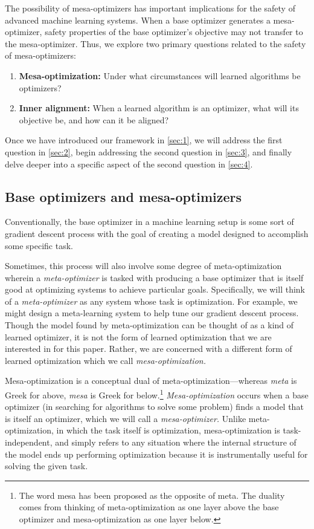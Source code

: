 \documentclass[
  onecolumn,
  natbib,
]{miri-tech-article}
\begin{document}
The possibility of mesa-optimizers has important implications for the safety of advanced machine learning systems. When a base optimizer generates a mesa-optimizer, safety properties of the base optimizer's objective may not transfer to the mesa-optimizer. Thus, we explore two primary questions related to the safety of mesa-optimizers:
\begin{enumerate}
\item \textbf{Mesa-optimization:} Under what circumstances will learned algorithms be optimizers?
\item \textbf{Inner alignment:} When a learned algorithm is an optimizer, what will its objective be, and how can it be aligned?
\end{enumerate}
Once we have introduced our framework in \cref{sec:1}, we will address the first question in \cref{sec:2}, begin addressing the second question in \cref{sec:3}, and finally delve deeper into a specific aspect of the second question in \cref{sec:4}.

\subsection{Base optimizers and mesa-optimizers}
\label{sec:1.1}

Conventionally, the base optimizer in a machine learning setup is some sort of gradient descent process with the goal of creating a model designed to accomplish some specific task.

Sometimes, this process will also involve some degree of meta-optimization wherein a \textit{meta-optimizer} is tasked with producing a base optimizer that is itself good at optimizing systems to achieve particular goals. Specifically, we will think of a \textit{meta-optimizer} as any system whose task is optimization. For example, we might design a meta-learning system to help tune our gradient descent process.\cite{grad_by_grad} Though the model found by meta-optimization can be thought of as a kind of learned optimizer, it is not the form of learned optimization that we are interested in for this paper. Rather, we are concerned with a different form of learned optimization which we call \textit{mesa-optimization.}

Mesa-optimization is a conceptual dual of meta-optimization---whereas \textit{meta} is Greek for above, \textit{mesa} is Greek for below.\footnote{The word mesa has been proposed as the opposite of meta.\cite{mesa} The duality comes from thinking of meta-optimization as one layer above the base optimizer and mesa-optimization as one layer below.} \textit{Mesa-optimization} occurs when a base optimizer (in searching for algorithms to solve some problem) finds a model that is itself an optimizer, which we will call a \textit{mesa-optimizer.} Unlike meta-optimization, in which the task itself is optimization, mesa-optimization is task-independent, and simply refers to any situation where the internal structure of the model ends up performing optimization because it is instrumentally useful for solving the given task.
\end{document}
